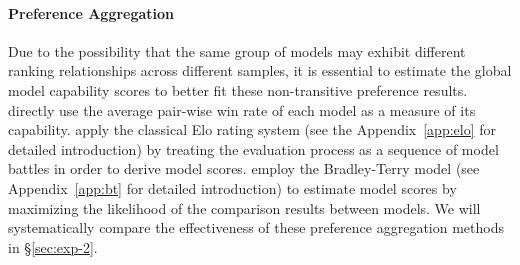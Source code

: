 \paragraph{Preference Aggregation}
\label{sec:2-pa}
Due to the possibility that the same group of models may exhibit different ranking relationships across different samples, it is essential to estimate the global model capability scores to better fit these non-transitive preference results.
\citet{alpacaeval,judging} directly use the average pair-wise win rate of each model as a measure of its capability. 
\citet{elo2,elo1} apply the classical Elo rating system \citep{elo} (see the Appendix~\ref{app:elo} for detailed introduction) by treating the evaluation process as a sequence of model battles in order to derive model scores. 
\citet{BTapp,arena} employ the Bradley-Terry model \citep{BT} (see Appendix~\ref{app:bt} for detailed introduction) to estimate model scores by maximizing the likelihood of the comparison results between models. We will systematically compare the effectiveness of these preference aggregation methods in \S\ref{sec:exp-2}.